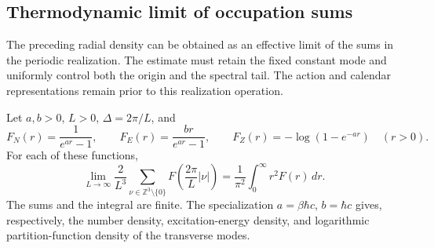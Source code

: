 \subsection{Thermodynamic limit of occupation sums}
\label{v:subsec:limite-termodinamico}

The preceding radial density can be obtained as an effective limit of the
sums in the periodic realization. The estimate must retain the fixed
constant mode and uniformly control both the origin and the spectral
tail. The action and calendar representations remain prior
to this realization operation.

\begin{lemma}
\label{v:lem:limite-termodinamico}
Let \(a,b>0\), \(L>0\), \(\Delta=2\pi/L\), and
\[
 F_N(r)=\frac{1}{e^{ar}-1},\qquad
 F_E(r)=\frac{br}{e^{ar}-1},\qquad
 F_Z(r)=-\log(1-e^{-ar})\quad(r>0).
\]
For each of these functions,
\begin{equation}
 \lim_{L\to\infty}\frac{2}{L^3}
 \sum_{\nu\in\mathbb Z^3\setminus\{0\}}
 F\!\left(\frac{2\pi}{L}|\nu|\right)
 =\frac{1}{\pi^2}\int_0^\infty r^2F(r)\,dr.
 \label{v:eq:limite-modos-discretos}
\end{equation}
The sums and the integral are finite. The specialization
\(a=\beta\hbar c\), \(b=\hbar c\) gives, respectively,
the number density, excitation-energy density, and logarithmic partition-function
density of the transverse modes.
\end{lemma}

